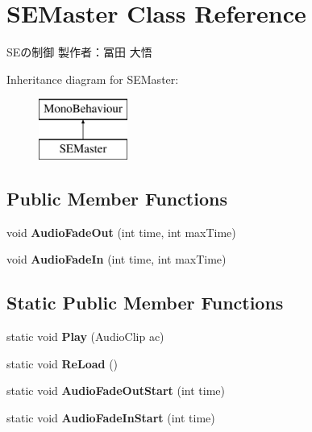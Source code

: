 \hypertarget{class_s_e_master}{}\section{S\+E\+Master Class Reference}
\label{class_s_e_master}


S\+Eの制御 製作者：冨田 大悟  


Inheritance diagram for S\+E\+Master\+:\begin{figure}[H]
\begin{center}
\leavevmode
\includegraphics[height=2.000000cm]{class_s_e_master}
\end{center}
\end{figure}
\subsection*{Public Member Functions}
\begin{DoxyCompactItemize}
\item 
\mbox{\label{class_s_e_master_a8874939eff8b3ad3a51753edcd0ab7ab}} 
void {\bfseries Audio\+Fade\+Out} (int time, int max\+Time)
\item 
\mbox{\label{class_s_e_master_aa288b63bc7b0d91a51f4ce846695e2ee}} 
void {\bfseries Audio\+Fade\+In} (int time, int max\+Time)
\end{DoxyCompactItemize}
\subsection*{Static Public Member Functions}
\begin{DoxyCompactItemize}
\item 
\mbox{\label{class_s_e_master_aff7df04252784f806cb2b1ae00c30301}} 
static void {\bfseries Play} (Audio\+Clip ac)
\item 
\mbox{\label{class_s_e_master_acfa9d671c5e3df50b2f2fc953216fd70}} 
static void {\bfseries Re\+Load} ()
\item 
\mbox{\label{class_s_e_master_a3102715b234d750a817854a357b2d32e}} 
static void {\bfseries Audio\+Fade\+Out\+Start} (int time)
\item 
\mbox{\label{class_s_e_master_ab3b05911691be7fd9f1a0a38ac39861f}} 
static void {\bfseries Audio\+Fade\+In\+Start} (int time)
\end{DoxyCompactItemize}
